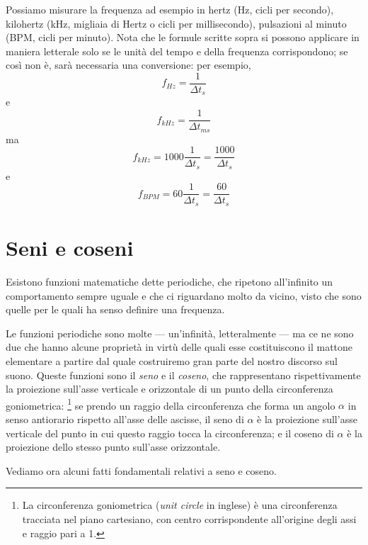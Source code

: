 \documentclass[11pt]{report}
\begin{document}
Possiamo misurare la frequenza ad esempio in hertz (Hz, cicli per secondo), kilohertz (kHz, migliaia di Hertz o cicli per millisecondo), pulsazioni al minuto (BPM, cicli per minuto). Nota che le formule scritte sopra si possono applicare in maniera letterale solo se le unità del tempo e della frequenza corrispondono; se così non è, sarà necessaria una conversione: per esempio,
\begin{equation}
f_{Hz} = \frac{1}{\Delta t_{s}}
\end{equation}
e
\begin{equation}
f_{kHz} = \frac{1}{\Delta t_{ms}}
\end{equation}
ma
\begin{equation}
f_{kHz} = 1000\frac{1}{\Delta t_{s}} = \frac{1000}{\Delta t_{s}}
\end{equation}
e
\begin{equation}
f_{BPM} = 60\frac{1}{\Delta t_{s}} = \frac{60}{\Delta t_{s}}
\end{equation}




\section{Seni e coseni}

Esistono funzioni matematiche dette periodiche, che ripetono all'infinito un comportamento sempre uguale e che ci riguardano molto da vicino, visto che sono quelle per le quali ha senso definire una frequenza.

Le funzioni periodiche sono molte --- un'infinità, letteralmente --- ma ce ne sono due che hanno alcune proprietà in virtù delle quali esse costituiscono il mattone elementare a partire dal quale costruiremo gran parte del nostro discorso sul suono. Queste funzioni sono il \emph{seno} e il \emph{coseno}, che rappresentano rispettivamente la proiezione sull'asse verticale e orizzontale di un punto della circonferenza goniometrica:%
\footnote{La circonferenza goniometrica (\emph{unit circle} in inglese) è una circonferenza tracciata nel piano cartesiano, con centro corrispondente all'origine degli assi e raggio pari a 1.}
se prendo un raggio della circonferenza che forma un angolo $\alpha$ in senso antiorario rispetto all'asse delle ascisse, il seno di $\alpha$ è la proiezione sull'asse verticale del punto in cui questo raggio tocca la circonferenza; e il coseno di $\alpha$ è la proiezione dello stesso punto sull'asse orizzontale.

Vediamo ora alcuni fatti fondamentali relativi a seno e coseno.
\end{document}

